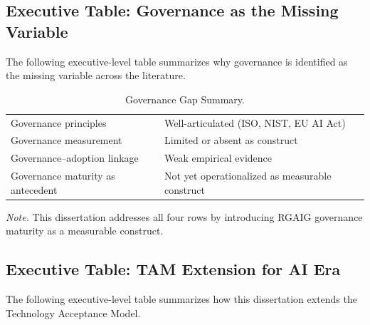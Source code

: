 \subsection{Executive Table: Governance as the Missing Variable}
\label{sec:exec_governance_gap}

\noindent The following executive-level table summarizes why governance is identified as the missing variable across the literature.

{\tablestripes\tablefontsize
{}
\begin{xltabular}{\textwidth}{@{} >{\raggedright\arraybackslash}p{6cm} L @{}}
\caption[Governance Gap Summary]{Governance Gap Summary.}\label{tab:exec_governance_gap} \\
\toprule
{} &  \\
\midrule
\endfirsthead
\endhead
\bottomrule
\endlastfoot
Governance principles & Well-articulated (ISO, NIST, EU AI Act) \\
\addlinespace
Governance measurement & Limited or absent as construct \\
\addlinespace
Governance--adoption linkage & Weak empirical evidence \\
\addlinespace
Governance maturity as antecedent & Not yet operationalized as measurable construct \\
\end{xltabular}}
\vspace{0.3em}\noindent\textit{Note.} This dissertation addresses all four rows by introducing RGAIG governance maturity as a measurable construct.


\subsection{Executive Table: TAM Extension for AI Era}
\label{sec:exec_tam_extension}

\noindent The following executive-level table summarizes how this dissertation extends the Technology Acceptance Model.

